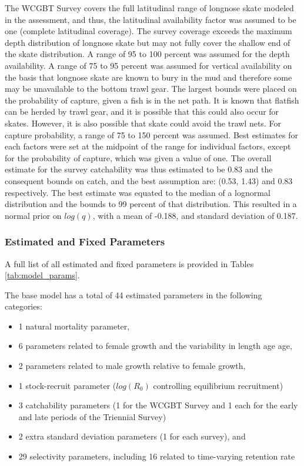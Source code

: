 \documentclass[12pt,]{article}
\begin{document}
The WCGBT Survey covers the full latitudinal range of longnose skate
modeled in the assessment, and thus, the latitudinal availability factor
was assumed to be one (complete latitudinal coverage). The survey
coverage exceeds the maximum depth distribution of longnose skate but
may not fully cover the shallow end of the skate distribution. A range
of 95 to 100 percent was assumed for the depth availability. A range of
75 to 95 percent was assumed for vertical availability on the basis that
longnose skate are known to bury in the mud and therefore some may be
unavailable to the bottom trawl gear. The largest bounds were placed on
the probability of capture, given a fish is in the net path. It is known
that flatfish can be herded by trawl gear, and it is possible that this
could also occur for skates. However, it is also possible that skate
could avoid the trawl nets. For capture probability, a range of 75 to
150 percent was assumed. Best estimates for each factors were set at the
midpoint of the range for individual factors, except for the probability
of capture, which was given a value of one. The overall estimate for the
survey catchability was thus estimated to be 0.83 and the consequent
bounds on catch, and the best assumption are: (0.53, 1.43) and 0.83
respectively. The best estimate was equated to the median of a lognormal
distribution and the bounds to 99 percent of that distribution. This
resulted in a normal prior on \(log(q)\), with a mean of -0.188, and
standard deviation of 0.187.

\hypertarget{estimated-and-fixed-parameters}{%
\subsubsection{Estimated and Fixed
Parameters}\label{estimated-and-fixed-parameters}}

A full list of all estimated and fixed parameters is provided in Tables
\ref{tab:model_params}.

The base model has a total of 44 estimated parameters in the following
categories:

\begin{itemize}
  \item 1 natural mortality parameter,
  \item 6 parameters related to female growth and the variability in length age age,
  \item 2 parameters related to male growth relative to female growth,
  \item 1 stock-recruit parameter ($log(R_0)$ controlling equilibrium recruitment)
  \item 3 catchability parameters (1 for the WCGBT Survey and 1 each for the early and late periods of the Triennial Survey)
  \item 2 extra standard deviation parameters (1 for each survey), and
  \item 29 selectivity parameters, including 16 related to time-varying retention rate
\end{itemize}
\end{document}
